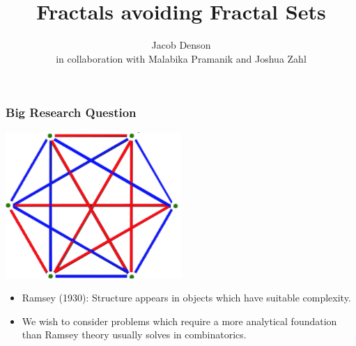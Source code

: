 \documentclass[handout,usenames,dvipsnames]{beamer}
\title{Fractals avoiding Fractal Sets}
\author{Jacob Denson\\ \footnotesize in collaboration with Malabika Pramanik and Joshua Zahl}
\institute{University of British Columbia}
\begin{document}
\maketitle




\begin{frame}
    \frametitle{Big Research Question}

    \begin{center}
    \includegraphics[width=0.5\textwidth]{../Images/RamseyTheory}
    \end{center}

    \begin{itemize}
        \item Ramsey (1930): Structure appears in objects which have suitable complexity.

        \item We wish to consider problems which require a more analytical foundation than Ramsey theory usually solves in combinatorics.
    \end{itemize}
\end{frame}
\end{document}
